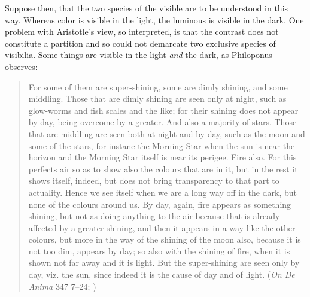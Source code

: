 Suppose then, that the two species of the visible are to be understood in this way. Whereas color is visible in the light, the luminous is visible in the dark. One problem with Aristotle's view, so interpreted, is that the contrast does not constitute a partition and so could not demarcate two exclusive species of visibilia. Some things are visible in the light \emph{and} the dark, as Philoponus observes:
\begin{quote}
	For some of them are super-shining, some are dimly shining, and some middling. Those that are dimly shining are seen only at night, such as glow-worms and fish scales and the like; for their shining does not appear by day, being overcome by a greater. And also a majority of stars. Those that are middling are seen both at night and by day, such as the moon and some of the stars, for instane the Morning Star when the sun is near the horizon and the Morning Star itself is near its perigee. Fire also. For this perfects air so as to show also the colours that are in it, but in the rest it shows itself, indeed, but does not bring transparency to that part to actuality. Hence we see itself when we are a long way off in the dark, but none of the colours around us. By day, again, fire appears as something shining, but not as doing anything to the air because that is already affected by a greater shining, and then it appears in a way like the other colours, but more in the way of the shining of the moon also, because it is not too dim, appears by day; so also with the shining of fire, when it is shown not far away and it is light. But the super-shining are seen only by day, viz. the sun, since indeed it is the cause of day and of light. (\emph{On \emph{De Anima}} 347 7--24; \citealt[32]{Charlton:2005fk})
\end{quote}

